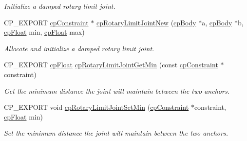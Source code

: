 \begin{DoxyCompactItemize}
\begin{DoxyCompactList}\small\item\em Initialize a damped rotary limit joint. \end{DoxyCompactList}\item 
\mbox{\label{group__cp_rotary_limit_joint_ga554abd3f6ed83f248f643b22cc6498bc}} 
C\+P\+\_\+\+E\+X\+P\+O\+RT \mbox{\hyperlink{structcp_constraint}{cp\+Constraint}} $\ast$ \mbox{\hyperlink{group__cp_rotary_limit_joint_ga554abd3f6ed83f248f643b22cc6498bc}{cp\+Rotary\+Limit\+Joint\+New}} (\mbox{\hyperlink{structcp_body}{cp\+Body}} $\ast$a, \mbox{\hyperlink{structcp_body}{cp\+Body}} $\ast$b, \mbox{\hyperlink{group__basic_types_gac1ed65573e035bf892505768c852d8d3}{cp\+Float}} min, \mbox{\hyperlink{group__basic_types_gac1ed65573e035bf892505768c852d8d3}{cp\+Float}} max)
\begin{DoxyCompactList}\small\item\em Allocate and initialize a damped rotary limit joint. \end{DoxyCompactList}\item 
\mbox{\label{group__cp_rotary_limit_joint_gaf46e42a44cfd7a7c6cfba362bf805d16}} 
C\+P\+\_\+\+E\+X\+P\+O\+RT \mbox{\hyperlink{group__basic_types_gac1ed65573e035bf892505768c852d8d3}{cp\+Float}} \mbox{\hyperlink{group__cp_rotary_limit_joint_gaf46e42a44cfd7a7c6cfba362bf805d16}{cp\+Rotary\+Limit\+Joint\+Get\+Min}} (const \mbox{\hyperlink{structcp_constraint}{cp\+Constraint}} $\ast$constraint)
\begin{DoxyCompactList}\small\item\em Get the minimum distance the joint will maintain between the two anchors. \end{DoxyCompactList}\item 
\mbox{\label{group__cp_rotary_limit_joint_ga922e77b62755609ab1be093349a3acd0}} 
C\+P\+\_\+\+E\+X\+P\+O\+RT void \mbox{\hyperlink{group__cp_rotary_limit_joint_ga922e77b62755609ab1be093349a3acd0}{cp\+Rotary\+Limit\+Joint\+Set\+Min}} (\mbox{\hyperlink{structcp_constraint}{cp\+Constraint}} $\ast$constraint, \mbox{\hyperlink{group__basic_types_gac1ed65573e035bf892505768c852d8d3}{cp\+Float}} min)
\begin{DoxyCompactList}\small\item\em Set the minimum distance the joint will maintain between the two anchors. \end{DoxyCompactList}\item 

\end{DoxyCompactItemize}
